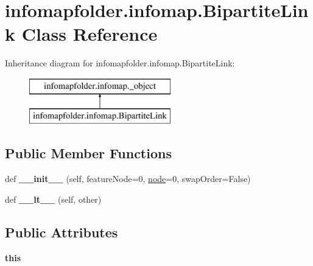 \hypertarget{classinfomapfolder_1_1infomap_1_1BipartiteLink}{}\section{infomapfolder.\+infomap.\+Bipartite\+Link Class Reference}
\label{classinfomapfolder_1_1infomap_1_1BipartiteLink}
Inheritance diagram for infomapfolder.\+infomap.\+Bipartite\+Link\+:\begin{figure}[H]
\begin{center}
\leavevmode
\includegraphics[height=2.000000cm]{classinfomapfolder_1_1infomap_1_1BipartiteLink}
\end{center}
\end{figure}
\subsection*{Public Member Functions}
\begin{DoxyCompactItemize}
\item 
\mbox{\label{classinfomapfolder_1_1infomap_1_1BipartiteLink_a8d71943629ec54e7e578a172bf5d8203}} 
def {\bfseries \+\_\+\+\_\+init\+\_\+\+\_\+} (self, feature\+Node=0, \mbox{\hyperlink{structnode}{node}}=0, swap\+Order=False)
\item 
\mbox{\label{classinfomapfolder_1_1infomap_1_1BipartiteLink_a1053f3ae5e7591cdd9c18c9b15ffd877}} 
def {\bfseries \+\_\+\+\_\+lt\+\_\+\+\_\+} (self, other)
\end{DoxyCompactItemize}
\subsection*{Public Attributes}
\begin{DoxyCompactItemize}
\item 
\mbox{\label{classinfomapfolder_1_1infomap_1_1BipartiteLink_ab8e52658b412d09e81edf1b48b8d0a0d}} 
{\bfseries this}
\end{DoxyCompactItemize}
